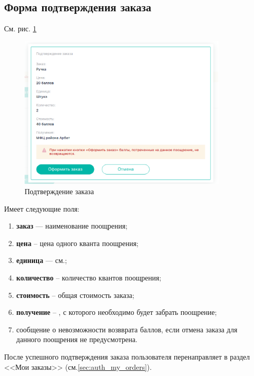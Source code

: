         \subsection{Форма подтверждения заказа}\label{sec:auth_cart_confirm}
            См. рис. \ref{fig:auth_cart_confirm}
            \begin{figure}
                \center
                \includegraphics[width=100mm]{04_auth_funcs/figures/07.eps}
                \caption{Подтверждение заказа}
                \label{fig:auth_cart_confirm}
            \end{figure}
 
            Имеет следующие поля:

            \begin{enumerate}
                \item \textbf{заказ} --- наименование поощрения;
                \item \textbf{цена} -- цена одного кванта поощрения;
                \item \textbf{единица} --- см.;
                \item \textbf{количество} -- количество квантов поощрения;
                \item \textbf{стоимость} -- общая стоимость заказа;
                \item \textbf{получение} -- , с которого
                необходимо будет забрать поощрение;
                \item сообщение о невозможности возвврата баллов, если отмена
                заказа для данного поощрения не предусмотрена.
            \end{enumerate}

            После успешного подтверждения заказа пользователя перенаправляет в
            раздел <<Мои заказы>> (см.\ref{sec:auth_my_orders}).


